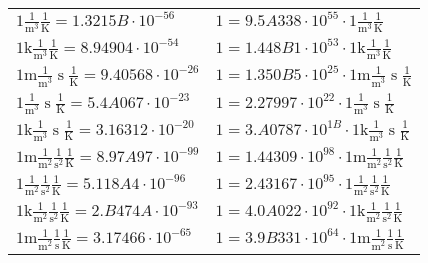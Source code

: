 \begin{center}
\begin{longtable}{l l}
{\color{black}$1 \bm{\mathrm{ }}\frac1{\operatorname{m}^3}{}{}\frac1{\operatorname{K}} = 1.3215B\cdot10^{-56} $}   & {\color{black}$ 1 = 9.5A338\cdot10^{55} \cdot 1 \bm{\mathrm{ }}\frac1{\operatorname{m}^3}{}{}\frac1{\operatorname{K}}$}  \\
{\color{gray}$1 \bm{\mathrm{ k}}\frac1{\operatorname{m}^3}{}{}\frac1{\operatorname{K}} = 8.94904\cdot10^{-54} $}   & {\color{gray}$ 1 = 1.448B1\cdot10^{53} \cdot 1 \bm{\mathrm{ k}}\frac1{\operatorname{m}^3}{}{}\frac1{\operatorname{K}}$}  \\
{\color{gray}$1 \bm{\mathrm{ m}}\frac1{\operatorname{m}^3}{\operatorname{s}}{}\frac1{\operatorname{K}} = 9.40568\cdot10^{-26} $}   & {\color{gray}$ 1 = 1.350B5\cdot10^{25} \cdot 1 \bm{\mathrm{ m}}\frac1{\operatorname{m}^3}{\operatorname{s}}{}\frac1{\operatorname{K}}$}  \\
{\color{black}$1 \bm{\mathrm{ }}\frac1{\operatorname{m}^3}{\operatorname{s}}{}\frac1{\operatorname{K}} = 5.4A067\cdot10^{-23} $}   & {\color{black}$ 1 = 2.27997\cdot10^{22} \cdot 1 \bm{\mathrm{ }}\frac1{\operatorname{m}^3}{\operatorname{s}}{}\frac1{\operatorname{K}}$}  \\
{\color{gray}$1 \bm{\mathrm{ k}}\frac1{\operatorname{m}^3}{\operatorname{s}}{}\frac1{\operatorname{K}} = 3.16312\cdot10^{-20} $}   & {\color{gray}$ 1 = 3.A0787\cdot10^{1B} \cdot 1 \bm{\mathrm{ k}}\frac1{\operatorname{m}^3}{\operatorname{s}}{}\frac1{\operatorname{K}}$}  \\
{\color{gray}$1 \bm{\mathrm{ m}}\frac1{\operatorname{m}^2}\frac1{\operatorname{s}^2}{}\frac1{\operatorname{K}} = 8.97A97\cdot10^{-99} $}   & {\color{gray}$ 1 = 1.44309\cdot10^{98} \cdot 1 \bm{\mathrm{ m}}\frac1{\operatorname{m}^2}\frac1{\operatorname{s}^2}{}\frac1{\operatorname{K}}$}  \\
{\color{black}$1 \bm{\mathrm{ }}\frac1{\operatorname{m}^2}\frac1{\operatorname{s}^2}{}\frac1{\operatorname{K}} = 5.118A4\cdot10^{-96} $}   & {\color{black}$ 1 = 2.43167\cdot10^{95} \cdot 1 \bm{\mathrm{ }}\frac1{\operatorname{m}^2}\frac1{\operatorname{s}^2}{}\frac1{\operatorname{K}}$}  \\
{\color{gray}$1 \bm{\mathrm{ k}}\frac1{\operatorname{m}^2}\frac1{\operatorname{s}^2}{}\frac1{\operatorname{K}} = 2.B474A\cdot10^{-93} $}   & {\color{gray}$ 1 = 4.0A022\cdot10^{92} \cdot 1 \bm{\mathrm{ k}}\frac1{\operatorname{m}^2}\frac1{\operatorname{s}^2}{}\frac1{\operatorname{K}}$}  \\
{\color{gray}$1 \bm{\mathrm{ m}}\frac1{\operatorname{m}^2}\frac1{\operatorname{s}}{}\frac1{\operatorname{K}} = 3.17466\cdot10^{-65} $}   & {\color{gray}$ 1 = 3.9B331\cdot10^{64} \cdot 1 \bm{\mathrm{ m}}\frac1{\operatorname{m}^2}\frac1{\operatorname{s}}{}\frac1{\operatorname{K}}$}  \\

\end{longtable}
\end{center}

